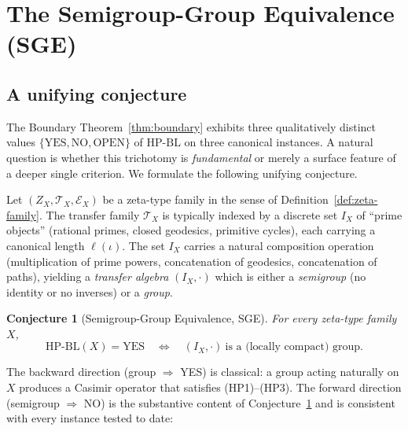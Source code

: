 \documentclass[11pt]{article}
\newtheorem{conjecture}[theorem]{Conjecture}
\theoremstyle{definition}
\theoremstyle{remark}
\newcommand{\HBL}{\mathrm{HP\text{-}BL}}
\begin{document}
\section{The Semigroup-Group Equivalence (SGE)}
\label{sec:sge-conjecture}

\subsection{A unifying conjecture}
\label{sec:sge-conjecture-statement}

The Boundary Theorem~\ref{thm:boundary} exhibits three qualitatively
distinct values $\{\mathrm{YES}, \mathrm{NO}, \mathrm{OPEN}\}$ of
$\HBL$ on three canonical instances. A natural question is whether
this trichotomy is \emph{fundamental} or merely a surface feature of
a deeper single criterion. We formulate the following unifying
conjecture.

Let $(Z_X, \mathcal{T}_X, \mathcal{E}_X)$ be a zeta-type family in
the sense of Definition~\ref{def:zeta-family}. The transfer family
$\mathcal{T}_X$ is typically indexed by a discrete set $I_X$ of
``prime objects'' (rational primes, closed geodesics, primitive
cycles), each carrying a canonical length $\ell(\iota)$. The set
$I_X$ carries a natural composition operation (multiplication of
prime powers, concatenation of geodesics, concatenation of paths),
yielding a \emph{transfer algebra} $(I_X, \cdot)$ which is either a
\emph{semigroup} (no identity or no inverses) or a \emph{group}.

\begin{conjecture}[Semigroup-Group Equivalence, SGE]
\label{conj:sge}
For every zeta-type family $X$,
\[
  \HBL(X) = \mathrm{YES}
  \quad\Longleftrightarrow\quad
  (I_X, \cdot)\ \text{is a (locally compact) group}.
\]
\end{conjecture}

The backward direction (group $\Rightarrow$ YES) is classical: a
group acting naturally on $X$ produces a Casimir operator that
satisfies (HP1)--(HP3). The forward direction (semigroup
$\Rightarrow$ NO) is the substantive content of
Conjecture~\ref{conj:sge} and is consistent with every instance
tested to date:
\end{document}
